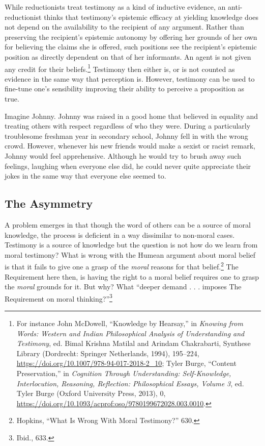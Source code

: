 \documentclass[phdthesis,12pt,final]{wuthesis}
\theoremstyle{definition}
\theoremstyle{definition}
\theoremstyle{definition}
\theoremstyle{definition}
\theoremstyle{remark}
\begin{document}
While reductionists treat testimony as a kind of inductive evidence, an anti-reductionist thinks that testimony's epistemic efficacy at yielding knowledge does not depend on the availability to the recipient of any argument. Rather than preserving the recipient's epistemic autonomy by offering her grounds of her own for believing the claims she is offered, such positions see the recipient's epistemic position as directly dependent on that of her informants. An agent is not given any credit for their beliefs.\footnote{For instance John McDowell, {``Knowledge by {Hearsay},''} in \emph{Knowing from {Words}: {Western} and {Indian Philosophical Analysis} of {Understanding} and {Testimony}}, ed. Bimal Krishna Matilal and Arindam Chakrabarti, Synthese {Library} (Dordrecht: Springer Netherlands, 1994), 195--224, \url{https://doi.org/10.1007/978-94-017-2018-2_10}; Tyler Burge, {``Content {Preservation},''} in \emph{Cognition {Through Understanding}: {Self-Knowledge}, {Interlocution}, {Reasoning}, {Reflection}: {Philosophical Essays}, {Volume} 3}, ed. Tyler Burge (Oxford University Press, 2013), 0, \url{https://doi.org/10.1093/acprof:oso/9780199672028.003.0010}.} Testimony then either is, or is not counted as evidence in the same way that perception is. However, testimony can be used to fine-tune one's sensibility improving their ability to perceive a proposition as true.

Imagine Johnny. Johnny was raised in a good home that believed in equality and treating others with respect regardless of who they were. During a particularly troublesome freshman year in secondary school, Johnny fell in with the wrong crowd. However, whenever his new friends would make a sexist or racist remark, Johnny would feel apprehensive. Although he would try to brush away such feelings, laughing when everyone else did, he could never quite appreciate their jokes in the same way that everyone else seemed to.

\subsection*{The Asymmetry}\label{the-asymmetry}

A problem emerges in that though the word of others can be a source of moral knowledge, the process is deficient in a way dissimilar to non-moral cases. Testimony is a source of knowledge but the question is not how do we learn from moral testimony? What is wrong with the Humean argument about moral belief is that it fails to give one a grasp of the \emph{moral} reasons for that belief.\footnote{Hopkins, {``What {Is Wrong With Moral Testimony}?''} 630.} The Requirement here then, is having the right to a moral belief requires one to grasp the \emph{moral} grounds for it. But why? What ``deeper demand . . . imposes The Requirement on moral thinking?''\footnote{Ibid., 633.}
\end{document}

